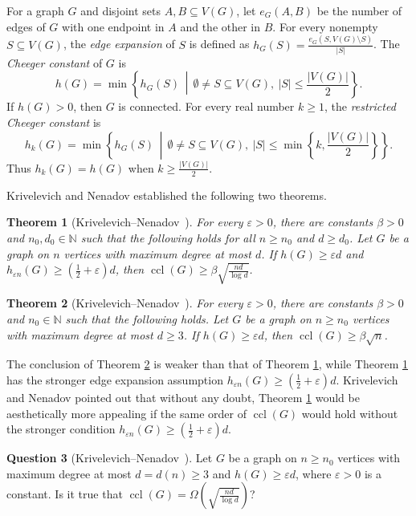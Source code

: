 \documentclass[11pt,a4paper]{article}
\newtheorem{theorem}{Theorem}[section]
\theoremstyle{definition}
\newtheorem{question}[theorem]{Question}
\theoremstyle{remark}
\DeclareMathOperator{\ccl}{ccl}
\newcommand{\N}{\mathbb N}
\newcommand{\eps}{\varepsilon}
\begin{document}
 
For a graph $G$ and disjoint sets $A,B\subseteq V(G)$, let $e_G(A,B)$ be the number of edges of $G$ with one endpoint in $A$ and the other in $B$. For every nonempty $S\subseteq V(G)$, the \emph{edge expansion} of $S$ is defined as $h_G(S)=\frac{e_G(S,V(G)\setminus S)}{|S|}$. The \emph{Cheeger constant} of $G$ is
\[
  h(G)=\min\left\{h_G(S)\,\middle|\,\emptyset\ne S\subseteq V(G),\ |S|\le\frac{|V(G)|}{2}\right\}.
\]
If $h(G)>0$, then $G$ is connected. For every real number $k\ge1$, the \emph{restricted Cheeger constant} is \cite{KN}
\[
  h_k(G)=\min\left\{h_G(S)\,\middle|\,\emptyset\ne S\subseteq V(G),\ |S|\le\min\left\{k,\frac{|V(G)|}{2}\right\}\right\}.
\]
Thus $h_k(G)=h(G)$ when $k\ge \frac{|V(G)|}{2}$.

Krivelevich and Nenadov \cite{KN} established the following two theorems.

\begin{theorem} 
[Krivelevich--Nenadov~{\cite[Theorem~1.1]{KN}}]
\label{thm:KN-strong}
For every $\eps>0$, there are constants $\beta>0$ and
$n_0,d_0\in\N$ such that the following holds for all $n\ge n_0$ and
$d\ge d_0$. Let $G$ be a graph on $n$ vertices with maximum degree
at most $d$. If $h(G)\ge\eps d$ and
$h_{\eps n}(G)\ge(\frac{1}{2}+\eps)d$, then
$\ccl(G)\ge\beta\sqrt{\frac{nd}{\log d}}$.
\end{theorem}

\begin{theorem} 
[Krivelevich--Nenadov~{\cite[Theorem~1.2]{KN}}]
\label{thm:KN-basic}
For every $\eps>0$, there are constants $\beta>0$ and $n_0\in\N$
such that the following holds. Let $G$ be a graph on $n\ge n_0$
vertices with maximum degree at most $d\ge3$. If
$h(G)\ge\eps d$, then $\ccl(G)\ge\beta\sqrt n$.
\end{theorem}

The conclusion of Theorem \ref{thm:KN-basic}  is weaker than that of Theorem \ref{thm:KN-strong}, while
Theorem \ref{thm:KN-strong} has the stronger edge expansion assumption 
$h_{\eps n}(G)\ge(\frac{1}{2}+\eps)d$. Krivelevich and Nenadov \cite{KN}  pointed out that without any doubt, Theorem \ref{thm:KN-strong} would be aesthetically more appealing if the same order of $\ccl(G)$ would hold without the stronger condition
$h_{\eps n}(G)\ge(\frac{1}{2}+\eps)d$. 

\begin{question}
[Krivelevich--Nenadov~{\cite[Question~4.1]{KN}}]
\label{ques:KN}
Let $G$ be a graph on $n\ge n_0$ vertices with maximum degree at most
$d=d(n)\ge3$ and $h(G)\ge\eps d$, where $\eps>0$ is a constant. Is
it true that $\ccl(G)=\Omega(\sqrt{\frac{nd}{\log d}})$?
\end{question}
\end{document}
